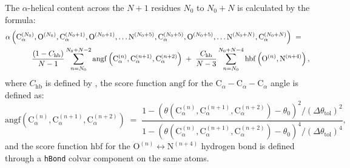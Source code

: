 The $\alpha$-helical content across the $N+1$ residues $N_{0}$ to $N_{0}+N$ is calculated by the formula:
\begin{eqnarray}
  \label{eq:colvars_alpha}
  {
    \alpha\left(
      \mathrm{C}_{\alpha}^{(N_{0})},
      \mathrm{O}^{(N_{0})},
      \mathrm{C}_{\alpha}^{(N_{0}+1)},
      \mathrm{O}^{(N_{0}+1)},
      \ldots
      \mathrm{N}^{(N_{0}+5)},
      \mathrm{C}_{\alpha}^{(N_{0}+5)},
      \mathrm{O}^{(N_{0}+5)},
      \ldots
      \mathrm{N}^{(N_{0}+N)},
      \mathrm{C}_{\alpha}^{(N_{0}+N)}
    \right)
  } \; = \; \; \; \; \\ \; \; \; \; {
    \nonumber
    \frac{(1-C_{\text{hb}})}{N-1}
    \sum_{n=N_{0}}^{N_{0}+N-2}
    \mathrm{angf}\left(
        \mathrm{C}_{\alpha}^{(n)},
        \mathrm{C}_{\alpha}^{(n+1)},
        \mathrm{C}_{\alpha}^{(n+2)}\right)
  } \; + \; {
    \frac{C_{\text{hb}}}{N-3}
    \sum_{n=N_{0}}^{N_{0}+N-4}
    \mathrm{hbf}\left(
      \mathrm{O}^{(n)},
      \mathrm{N}^{(n+4)}\right) \mathrm{,}
  } \\
\end{eqnarray}
where $C_{\text{hb}}$ is defined by ,
the score function $\mathrm{angf}$ for the $\mathrm{C}_{\alpha} -
\mathrm{C}_{\alpha} - \mathrm{C}_{\alpha}$ angle is defined as:
\begin{equation}
  \label{eq:colvars_alpha_Calpha}
  {
    \mathrm{angf}\left(
      \mathrm{C}_{\alpha}^{(n)},
      \mathrm{C}_{\alpha}^{(n+1)},
      \mathrm{C}_{\alpha}^{(n+2)}\right)
  } \; = \; {
    \frac{1 - \left(\theta(
        \mathrm{C}_{\alpha}^{(n)},
        \mathrm{C}_{\alpha}^{(n+1)},
        \mathrm{C}_{\alpha}^{(n+2)}) -
        \theta_{0}\right)^{2} /
      \left(\Delta\theta_{\mathrm{tol}}\right)^{2}}{
      1 - \left(\theta(
        \mathrm{C}_{\alpha}^{(n)},
        \mathrm{C}_{\alpha}^{(n+1)},
        \mathrm{C}_{\alpha}^{(n+2)}) -
        \theta_{0}\right)^{4} /
      \left(\Delta\theta_{\mathrm{tol}}\right)^{4}} \mathrm{,}
  }
\end{equation}
and the score function $\mathrm{hbf}$ for the $\mathrm{O}^{(n)} \leftrightarrow
\mathrm{N}^{(n+4)}$ hydrogen bond is defined through a \texttt{hBond}
colvar component on the same atoms.



